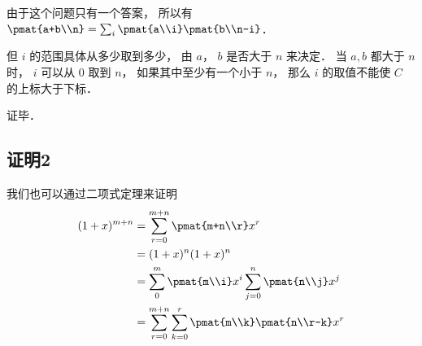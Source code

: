 由于这个问题只有一个答案， 所以有 $\pmat{a+b\\n} = \sum_i \pmat{a\\i} \pmat{b\\n-i}$． 

但 $i$ 的范围具体从多少取到多少， 由 $a$，  $b$ 是否大于 $n$ 来决定． 当 $a,b$ 都大于 $n$ 时， $i$ 可以从 0 取到 $n$，  如果其中至少有一个小于 $n$，  那么 $i$ 的取值不能使 $C$ 的上标大于下标．

证毕．

\subsection{证明2}
我们也可以通过二项式定理来证明
\begin{equation}
\begin{aligned}
(1 + x)^{m+n} &= \sum_{r=0}^{m+n} \pmat{m+n\\r}x^r\\
&=(1+x)^n (1+x)^n\\
&=\sum_0^m \pmat{m\\i}x^i  \sum_{j=0}^n \pmat{n\\j} x^j\\
&=\sum_{r=0}^{m+n} \sum_{k=0}^r \pmat{m\\k} \pmat{n\\r-k} x^r
\end{aligned}
\end{equation}
